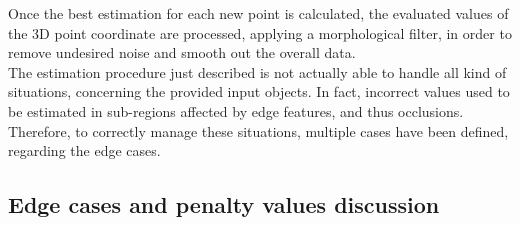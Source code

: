 Once the best estimation for each new point is calculated, the evaluated values of the 3D point coordinate are processed, applying a morphological filter, in order to remove undesired noise and smooth out the overall data. \\
The estimation procedure just described is not actually able to handle all kind of situations, concerning the provided input objects.
In fact, incorrect values used to be estimated in sub-regions affected by edge features, and thus occlusions. \\
Therefore, to correctly manage these situations, multiple cases have been defined, regarding the edge cases. 

\subsection{Edge cases and penalty values discussion}
\label{subsection:edge-cases-and-penalties}

